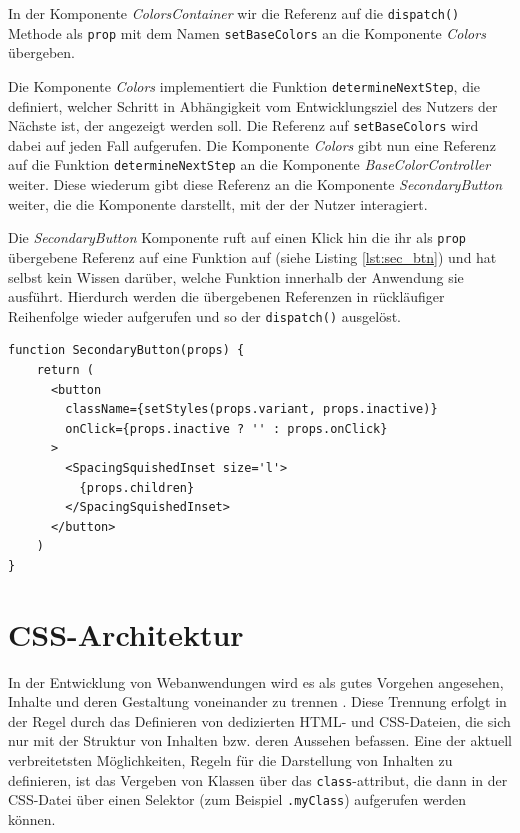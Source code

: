 In der Komponente \textit{ColorsContainer} wir die Referenz auf die \verb|dispatch()| Methode als \verb|prop| mit dem Namen \verb|setBaseColors| an die Komponente \textit{Colors} übergeben.

Die Komponente \textit{Colors} implementiert die Funktion \verb|determineNextStep|, die definiert, welcher Schritt in Abhängigkeit vom Entwicklungsziel des Nutzers der Nächste ist, der angezeigt werden soll. Die Referenz auf \verb|setBaseColors| wird dabei auf jeden Fall aufgerufen. Die Komponente \textit{Colors} gibt nun eine Referenz auf die Funktion \verb|determineNextStep| an die Komponente \textit{BaseColorController} weiter. Diese wiederum gibt diese Referenz an die Komponente \textit{SecondaryButton} weiter, die die Komponente darstellt, mit der der Nutzer interagiert.

Die \textit{SecondaryButton} Komponente ruft auf einen Klick hin die ihr als \verb|prop| übergebene Referenz auf eine Funktion auf (siehe Listing \ref{lst:sec_btn}) und hat selbst kein Wissen darüber, welche Funktion innerhalb der Anwendung sie ausführt. Hierdurch werden die übergebenen Referenzen in rückläufiger Reihenfolge wieder aufgerufen und so der \verb|dispatch()| ausgelöst.

\begin{lstlisting}[caption={Aufruf der übergebenen Funktion in der Komponente \textit{SecondaryButton}}, label=lst:sec_btn]
  function SecondaryButton(props) {
    return (
      <button
        className={setStyles(props.variant, props.inactive)}
        onClick={props.inactive ? '' : props.onClick}
      >
        <SpacingSquishedInset size='l'>
          {props.children}
        </SpacingSquishedInset>
      </button>
    )
}
\end{lstlisting}

\section{CSS-Architektur}
In der Entwicklung von Webanwendungen wird es als gutes Vorgehen angesehen, Inhalte und deren Gestaltung voneinander zu trennen \cite[S. 56]{goodman2002dynamic}. Diese Trennung erfolgt in der Regel durch das Definieren von dedizierten HTML- und CSS-Dateien, die sich nur mit der Struktur von Inhalten bzw. deren Aussehen befassen.
Eine der aktuell verbreitetsten Möglichkeiten, Regeln für die Darstellung von Inhalten zu definieren, ist das Vergeben von Klassen über das \verb|class|-attribut, die dann in der CSS-Datei über einen Selektor (zum Beispiel \verb|.myClass|) aufgerufen werden können.

